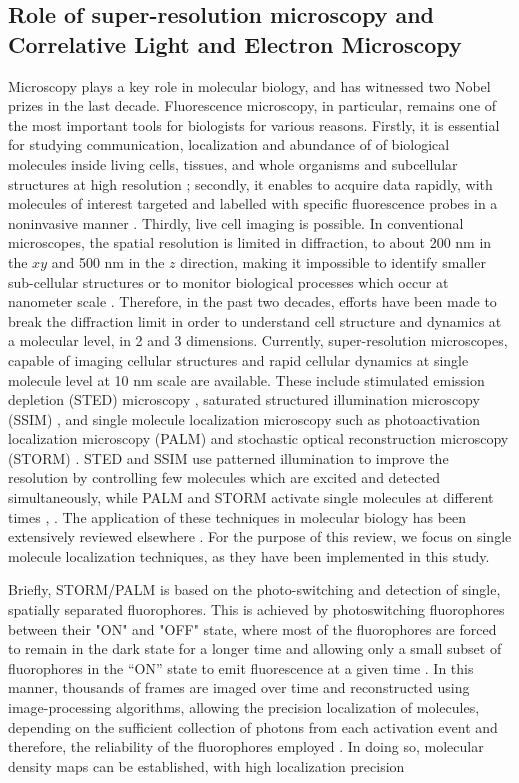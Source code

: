 \subsection{Role of super-resolution microscopy and Correlative Light and Electron Microscopy}
Microscopy plays a key role in molecular biology, and has witnessed two Nobel prizes in the last decade. Fluorescence microscopy, in particular, remains one of the most important tools for biologists for various reasons. Firstly, it is essential for studying communication, localization and abundance of  of biological molecules inside living cells, tissues, and whole organisms and subcellular structures at high resolution \citep{Han2013}; secondly, it enables to acquire data rapidly, with molecules of interest targeted and labelled with specific fluorescence probes in a noninvasive manner \citep{Han2013}. Thirdly, live cell imaging is possible. In conventional microscopes, the spatial resolution is limited in diffraction, to about 200 nm in the $xy$ and 500 nm in the $z$ direction, making it impossible to identify smaller sub-cellular structures or to monitor biological processes which occur at nanometer scale \citep{Xu2017}. Therefore, in the past two decades, efforts have been made to break the diffraction limit in order to understand cell structure and dynamics at a molecular level, in 2 and 3 dimensions. Currently, super-resolution microscopes, capable of imaging cellular structures and rapid cellular dynamics at single molecule level at 10 nm scale are available. These include stimulated emission depletion (STED) microscopy \citep{Klar1999}, saturated structured illumination microscopy (SSIM) \citep{Gustafsson2005}, and single molecule localization microscopy such as  photoactivation localization microscopy (PALM) \citep{Betzig2006} and stochastic optical reconstruction microscopy (STORM) \citep{Huang2008,Xu2017}. STED and SSIM use patterned illumination to improve the resolution by controlling few molecules which are excited and detected simultaneously, while PALM and STORM activate single molecules at different times \citep{Han2013}, . The application of these techniques in molecular biology has been extensively reviewed elsewhere \citep{Han2013}. For the purpose of this review, we focus on single molecule localization techniques, as they have been implemented in this study.  

Briefly, STORM/PALM is based on the photo-switching and detection of single, spatially separated fluorophores. This is achieved by photoswitching  fluorophores between their  "ON" and "OFF" state, where most of the fluorophores are forced to remain in the dark state for a longer time and allowing only a small subset of fluorophores  in  the “ON” state to emit fluorescence at a given time \citep{Turkowyd2016}. In this manner, thousands of frames are imaged over time  and reconstructed using image-processing algorithms, allowing the precision localization of molecules, depending on the sufficient collection of photons from each activation event and therefore, the reliability of the fluorophores employed \citep{Turkowyd2016,Xu2017}. In doing so, molecular density maps can be established, with high localization precision 

